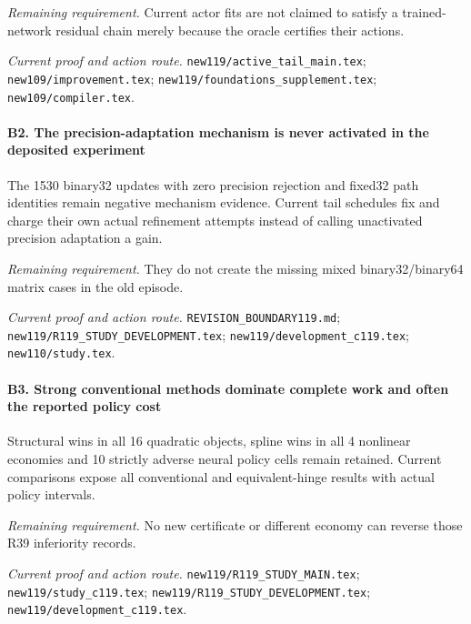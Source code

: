 \par\emph{Remaining requirement.} Current actor fits are not claimed to satisfy a trained-network residual chain merely because the oracle certifies their actions.

\par\emph{Current proof and action route.} \nolinkurl{new119/active_tail_main.tex}; \nolinkurl{new109/improvement.tex}; \nolinkurl{new119/foundations_supplement.tex}; \nolinkurl{new109/compiler.tex}.

\paragraph{B2. The precision-adaptation mechanism is never activated in the deposited experiment}

The 1530 binary32 updates with zero precision rejection and fixed32 path identities remain negative mechanism evidence. Current tail schedules fix and charge their own actual refinement attempts instead of calling unactivated precision adaptation a gain.

\par\emph{Remaining requirement.} They do not create the missing mixed binary32/binary64 matrix cases in the old episode.

\par\emph{Current proof and action route.} \nolinkurl{REVISION_BOUNDARY119.md}; \nolinkurl{new119/R119_STUDY_DEVELOPMENT.tex}; \nolinkurl{new119/development_c119.tex}; \nolinkurl{new110/study.tex}.

\paragraph{B3. Strong conventional methods dominate complete work and often the reported policy cost}

Structural wins in all 16 quadratic objects, spline wins in all 4 nonlinear economies and 10 strictly adverse neural policy cells remain retained. Current comparisons expose all conventional and equivalent-hinge results with actual policy intervals.

\par\emph{Remaining requirement.} No new certificate or different economy can reverse those R39 inferiority records.

\par\emph{Current proof and action route.} \nolinkurl{new119/R119_STUDY_MAIN.tex}; \nolinkurl{new119/study_c119.tex}; \nolinkurl{new119/R119_STUDY_DEVELOPMENT.tex}; \nolinkurl{new119/development_c119.tex}.

